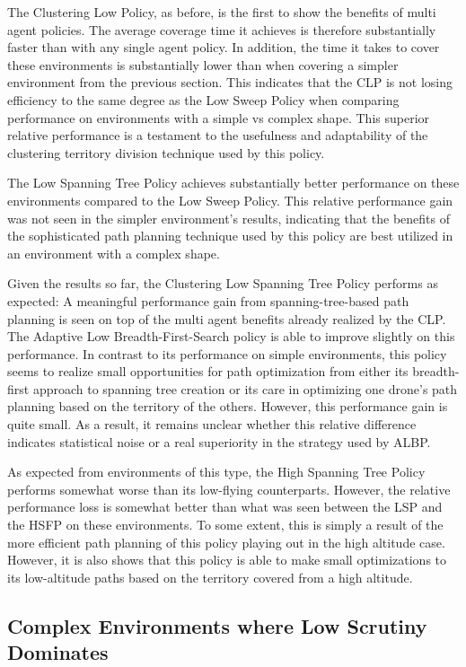 The Clustering Low Policy, as before, is the first to show the benefits of multi agent policies. The average coverage time it achieves is therefore substantially faster than with any single agent policy. In addition, the time it takes to cover these environments is substantially lower than when covering a simpler environment from the previous section. This indicates that the CLP is not losing efficiency to the same degree as the Low Sweep Policy when comparing performance on environments with a simple vs complex shape. This superior relative performance is a testament to the usefulness and adaptability of the clustering territory division technique used by this policy.

The Low Spanning Tree Policy achieves substantially better performance on these environments compared to the Low Sweep Policy. This relative performance gain was not seen in the simpler environment's results, indicating that the benefits of the sophisticated path planning technique used by this policy are best utilized in an environment with a complex shape.

Given the results so far, the Clustering Low Spanning Tree Policy performs as expected: A meaningful performance gain from spanning-tree-based path planning is seen on top of the multi agent benefits already realized by the CLP. The Adaptive Low Breadth-First-Search policy is able to improve slightly on this performance. In contrast to its performance on simple environments, this policy seems to realize small opportunities for path optimization from either its breadth-first approach to spanning tree creation or its care in optimizing one drone's path planning based on the territory of the others. However, this performance gain is quite small. As a result, it remains unclear whether this relative difference indicates statistical noise or a real superiority in the strategy used by ALBP.

As expected from environments of this type, the High Spanning Tree Policy performs somewhat worse than its low-flying counterparts. However, the relative performance loss is somewhat better than what was seen between the LSP and the HSFP on these environments. To some extent, this is simply a result of the more efficient path planning of this policy playing out in the high altitude case. However, it is also shows that this policy is able to make small optimizations to its low-altitude paths based on the territory covered from a high altitude.

\subsection{Complex Environments where Low Scrutiny Dominates}

